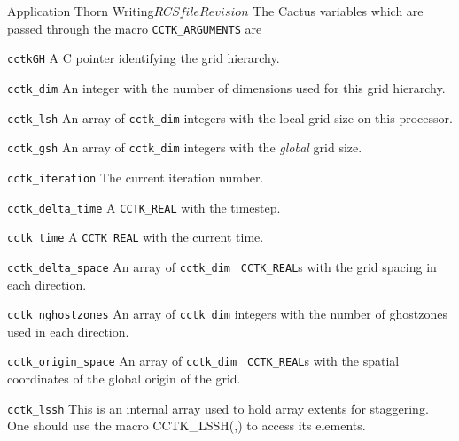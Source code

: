 \begin{cactuspart}{Application Thorn Writing}{$RCSfile$}{$Revision$}
The Cactus variables which are passed through the macro
\texttt{CCTK\_ARGUMENTS} are
\begin{Lentry}
\item [\texttt{cctkGH}] A C pointer identifying the grid hierarchy.
\item [\texttt{cctk\_dim}] An integer with the number of dimensions
      used for this grid hierarchy.
\item [\texttt{cctk\_lsh}] An array of \texttt{cctk\_dim} integers
      with the local grid size on this processor.
\item [\texttt{cctk\_gsh}] An array of \texttt{cctk\_dim} integers
      with the \textit{global} grid size.
\item [\texttt{cctk\_iteration}] The current iteration number.
\item [\texttt{cctk\_delta\_time}] A \texttt{CCTK\_REAL} with the timestep.
\item [\texttt{cctk\_time}] A \texttt{CCTK\_REAL} with the current time.
\item [\texttt{cctk\_delta\_space}] An array of \texttt{cctk\_dim} {\tt
CCTK\_REAL}s with the grid spacing in each direction.
\item [\texttt{cctk\_nghostzones}] An array of \texttt{cctk\_dim} integers with
         the number of ghostzones used in each direction.
\item [\texttt{cctk\_origin\_space}] An array of \texttt{cctk\_dim} {\tt
      CCTK\_REAL}s with the spatial coordinates of the global origin
      of the grid.
\item [\texttt{cctk\_lssh}]  This is an internal array used to hold
array extents for staggering.  One should use the macro CCTK\_LSSH(,)
to access its elements.

\end{Lentry}


\end{cactuspart}
